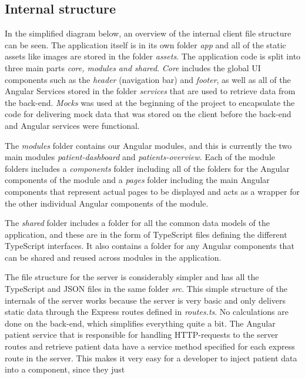 \documentclass[10pt,a4paper]{article}
\begin{document}
\subsection{Internal structure}
In the simplified diagram below, an overview of the internal client file structure can be seen. The application itself is in its own folder \textit{app} and all of the static assets like images are stored in the folder \textit{assets}. The application code is split into three main parts \textit{core, modules and shared}. \textit{Core} includes the global UI components such as the \textit{header} (navigation bar) and \textit{footer}, as well as all of the Angular Services stored in the folder \textit{services} that are used to retrieve data from the back-end. \textit{Mocks} was used at the beginning of the project to encapsulate the code for delivering mock data that was stored on the client before the back-end and Angular services were functional. 

The \textit{modules} folder contains our Angular modules, and this is currently the two main modules \textit{patient-dashboard} and \textit{patients-overview}. Each of the module folders includes a \textit{components} folder including all of the folders for the Angular components of the module and a \textit{pages} folder including the main Angular components that represent actual pages to be displayed and acts as a wrapper for the other individual Angular components of the module.

The \textit{shared} folder includes a folder for all the common data models of the application, and these are in the form of TypeScript files defining the different TypeScript interfaces. It also contains a folder for any Angular components that can be shared and reused across modules in the application.

The file structure for the server is considerably simpler and has all the TypeScript and JSON files in the same folder \textit{src}. This simple structure of the internals of the server works because the server is very basic and only delivers static data through the Express routes defined in \textit{routes.ts}. No calculations are done on the back-end, which simplifies everything quite a bit. The Angular patient service that is responsible for handling HTTP-requests to the server routes and retrieve patient data have a service method specified for each express route in the server. This makes it very easy for a developer to inject patient data into a component, since they just 


\end{document}

